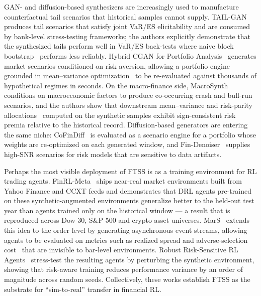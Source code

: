 GAN- and diffusion-based synthesizers are increasingly used to
manufacture counterfactual tail scenarios that historical
samples cannot supply. TAIL-GAN~\citep{cont2025tailgan} produces tail
scenarios that satisfy joint VaR/ES elicitability and are consumed by
bank-level stress-testing frameworks; the authors explicitly demonstrate
that the synthesized tails perform well in VaR/ES back-tests where naive
block bootstrap~\citep{politis1994stationary} performs less reliably. Hybrid CGAN for Portfolio
Analysis~\citep{lu2022hybrid} generates market scenarios conditioned on
risk aversion, allowing a portfolio engine grounded in mean--variance optimization~\citep{markowitz1952portfolio} to be re-evaluated against
thousands of hypothetical regimes in seconds. On the macro-finance
side, MacroSynth~\citep{alex2024macroeconomic} conditions on
macroeconomic factors to produce co-occurring crash and bull-run
scenarios, and the authors show that downstream mean--variance and
risk-parity allocations~\citep{maillard2010properties} computed on the synthetic samples exhibit
sign-consistent risk premia relative to the historical record.
Diffusion-based generators are entering the same niche:
CoFinDiff~\citep{tanaka2025cofindiff} is evaluated as a scenario engine
for a portfolio whose weights are re-optimized on each generated
window, and Fin-Denoiser~\citep{wang2024denoiser} supplies high-SNR
scenarios for risk models that are sensitive to data
artifacts.

Perhaps the most visible deployment of FTSS is as a training environment for RL
trading agents. FinRL-Meta~\citep{liu2022finrlmeta} ships near-real
market environments built from Yahoo Finance and CCXT feeds and
demonstrates that DRL agents pre-trained on these synthetic-augmented
environments generalize better to the held-out test year than agents
trained only on the historical window --- a result that is reproduced
across Dow-30, S\&P-500 and crypto-asset universes.
MarS~\citep{li2025mars} extends this idea to the order level by
generating asynchronous event streams, allowing agents to be evaluated
on metrics such as realized spread and adverse-selection cost~\citep{glosten1985bid,huang1996dealer} that are invisible to bar-level environments. Robust Risk-Sensitive RL
Agents~\citep{gao2021robust} stress-test the resulting agents by
perturbing the synthetic environment, showing that risk-aware training
reduces performance variance by an order of magnitude across random
seeds. Collectively, these works establish FTSS as the substrate for
``sim-to-real'' transfer in financial RL.

